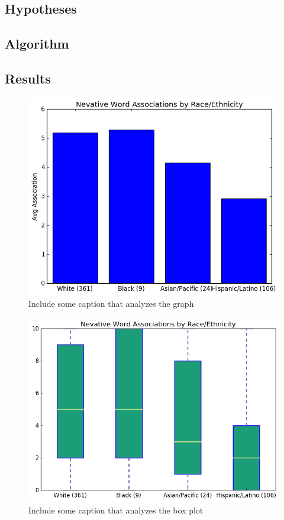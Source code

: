 \documentclass[sigconf]{acmart}
\begin{document}
\subsection{Hypotheses}

\subsection{Algorithm}

\subsection{Results}

\begin{figure}
\includegraphics[width=\columnwidth]{images/fig1.png}
\caption{Include some caption that analyzes the graph}
\label{Figure 1}
\end{figure}

\begin{figure}
\includegraphics[width=\columnwidth]{images/fig2.png}
\caption{Include some caption that analyzes the box plot}
\label{Figure 2}
\end{figure}
\end{document}
